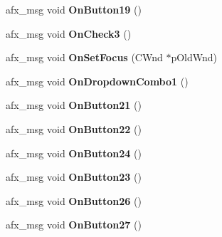 \begin{DoxyCompactItemize}
\item 
\hypertarget{class_c_wavfrag_dlg_ac08f7bd003bad4eb63c2a2a1711c31a6}{afx\-\_\-msg void {\bfseries On\-Button19} ()}\label{class_c_wavfrag_dlg_ac08f7bd003bad4eb63c2a2a1711c31a6}

\item 
\hypertarget{class_c_wavfrag_dlg_a47b14388866f5c1f3f890f8b36641fa5}{afx\-\_\-msg void {\bfseries On\-Check3} ()}\label{class_c_wavfrag_dlg_a47b14388866f5c1f3f890f8b36641fa5}

\item 
\hypertarget{class_c_wavfrag_dlg_ab4221bc7ae8a60a3084dda1332fc92b5}{afx\-\_\-msg void {\bfseries On\-Set\-Focus} (C\-Wnd $\ast$p\-Old\-Wnd)}\label{class_c_wavfrag_dlg_ab4221bc7ae8a60a3084dda1332fc92b5}

\item 
\hypertarget{class_c_wavfrag_dlg_ab7d38def039e1484e272cc63668f6a55}{afx\-\_\-msg void {\bfseries On\-Dropdown\-Combo1} ()}\label{class_c_wavfrag_dlg_ab7d38def039e1484e272cc63668f6a55}

\item 
\hypertarget{class_c_wavfrag_dlg_a447f0c05a311bfd0ec3a1ad1c12182cf}{afx\-\_\-msg void {\bfseries On\-Button21} ()}\label{class_c_wavfrag_dlg_a447f0c05a311bfd0ec3a1ad1c12182cf}

\item 
\hypertarget{class_c_wavfrag_dlg_a4a7ed8bcb7ab8e46d15b6b7d619d213d}{afx\-\_\-msg void {\bfseries On\-Button22} ()}\label{class_c_wavfrag_dlg_a4a7ed8bcb7ab8e46d15b6b7d619d213d}

\item 
\hypertarget{class_c_wavfrag_dlg_a3b49810a008422fa780ae4d8620c5feb}{afx\-\_\-msg void {\bfseries On\-Button24} ()}\label{class_c_wavfrag_dlg_a3b49810a008422fa780ae4d8620c5feb}

\item 
\hypertarget{class_c_wavfrag_dlg_a74ddb8a4bfd950b31ca1e9cf59d63973}{afx\-\_\-msg void {\bfseries On\-Button23} ()}\label{class_c_wavfrag_dlg_a74ddb8a4bfd950b31ca1e9cf59d63973}

\item 
\hypertarget{class_c_wavfrag_dlg_a26c437624e8391502e817dee8a648b6d}{afx\-\_\-msg void {\bfseries On\-Button26} ()}\label{class_c_wavfrag_dlg_a26c437624e8391502e817dee8a648b6d}

\item 
\hypertarget{class_c_wavfrag_dlg_ac96f8dfb639755b764af85d912b52883}{afx\-\_\-msg void {\bfseries On\-Button27} ()}\label{class_c_wavfrag_dlg_ac96f8dfb639755b764af85d912b52883}


\end{DoxyCompactItemize}
